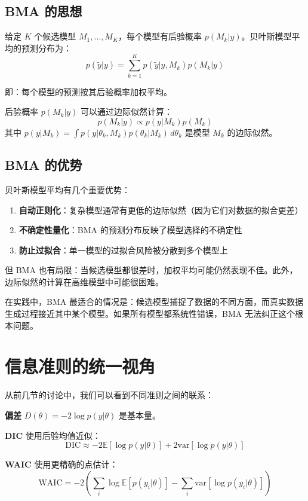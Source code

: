 \subsection{BMA 的思想}

给定 $K$ 个候选模型 $M_1, \ldots, M_K$，每个模型有后验概率 $p(M_k | y)$。贝叶斯模型平均的预测分布为：
\[
p(\tilde{y} | y) = \sum_{k=1}^K p(\tilde{y} | y, M_k) p(M_k | y)
\]

即：每个模型的预测按其后验概率加权平均。

后验概率 $p(M_k | y)$ 可以通过边际似然计算：
\[
p(M_k | y) \propto p(y | M_k) p(M_k)
\]
其中 $p(y | M_k) = \int p(y | \theta_k, M_k) p(\theta_k | M_k) \, d\theta_k$ 是模型 $M_k$ 的边际似然。

\subsection{BMA 的优势}

贝叶斯模型平均有几个重要优势：

\begin{enumerate}
  \item \textbf{自动正则化}：复杂模型通常有更低的边际似然（因为它们对数据的拟合更差）
  \item \textbf{不确定性量化}：BMA 的预测分布反映了模型选择的不确定性
  \item \textbf{防止过拟合}：单一模型的过拟合风险被分散到多个模型上
\end{enumerate}

但 BMA 也有局限：当候选模型都很差时，加权平均可能仍然表现不佳。此外，边际似然的计算在高维模型中可能很困难。

\begin{Remark}
  在实践中，BMA 最适合的情况是：候选模型捕捉了数据的不同方面，而真实数据生成过程接近其中某个模型。如果所有模型都系统性错误，BMA 无法纠正这个根本问题。
\end{Remark}

\section{信息准则的统一视角}

从前几节的讨论中，我们可以看到不同准则之间的联系：

\textbf{偏差} $D(\theta) = -2\log p(y|\theta)$ 是基本量。

\textbf{DIC} 使用后验均值近似：
\[
\text{DIC} \approx -2 \mathbb{E}[\log p(y | \theta)] + 2 \text{var}[\log p(y | \theta)]
\]

\textbf{WAIC} 使用更精确的点估计：
\[
\text{WAIC} = -2 \left(\sum_i \log \mathbb{E}[p(y_i | \theta)] - \sum_i \text{var}[\log p(y_i | \theta)]\right)
\]

